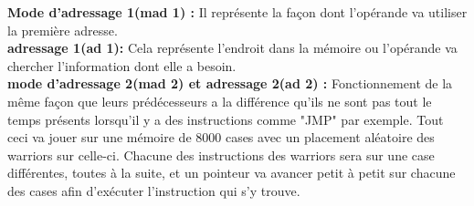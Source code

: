 \documentclass[a4paper,12pt]{article}
\begin{document}
\textbf{Mode d'adressage 1(mad 1) : }Il représente la façon dont l'opérande va utiliser la première adresse.\\
\textbf{adressage 1(ad 1):} Cela représente l'endroit dans la mémoire ou l'opérande va chercher l'information dont elle a besoin.\\
\textbf{mode d'adressage 2(mad 2) et adressage 2(ad 2) : }Fonctionnement de la même façon que leurs prédécesseurs a la différence qu'ils ne sont pas tout le temps présents lorsqu'il y a des instructions comme "JMP" par exemple.
\bigbreak
Tout ceci va jouer sur une mémoire de 8000 cases avec un placement aléatoire des warriors sur celle-ci. Chacune des instructions des warriors sera sur une case différentes, toutes à la suite, et un pointeur va avancer petit à petit sur chacune des cases afin d'exécuter l'instruction qui s'y trouve.
\end{document}
